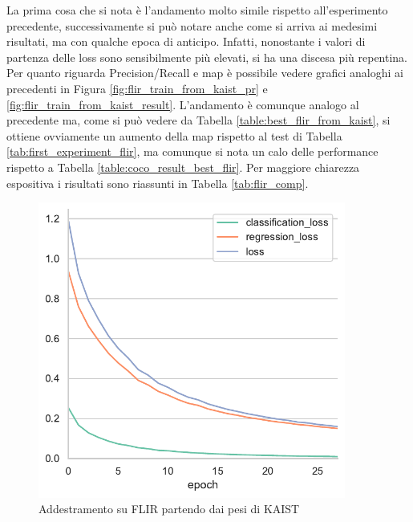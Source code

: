 La prima cosa che si nota è l'andamento molto simile rispetto all'esperimento precedente, successivamente si può notare anche come si arriva ai medesimi risultati, ma con qualche epoca di anticipo. Infatti, nonostante i valori di partenza delle loss sono sensibilmente più elevati, si ha una discesa più repentina. Per quanto riguarda Precision/Recall e \ac{map} è possibile vedere grafici analoghi ai precedenti in Figura \ref{fig:flir_train_from_kaist_pr} e \ref{fig:flir_train_from_kaist_result}. L'andamento è comunque analogo al precedente ma, come si può vedere da Tabella \ref{table:best_flir_from_kaist}, si ottiene ovviamente un aumento della \ac{map} rispetto al test di Tabella \ref{tab:first_experiment_flir}, ma comunque si nota un calo delle performance rispetto a Tabella \ref{table:coco_result_best_flir}. Per maggiore chiarezza espositiva i risultati sono riassunti in Tabella \ref{tab:flir_comp}.
\begin{figure}[]
    \centering
    \includegraphics[width=0.9\textwidth]{images/graphic/flir_from_kaist.pdf}
    \caption{Addestramento su FLIR partendo dai pesi di KAIST}
    \label{fig:flir_train_from_kaist}
\end{figure}
